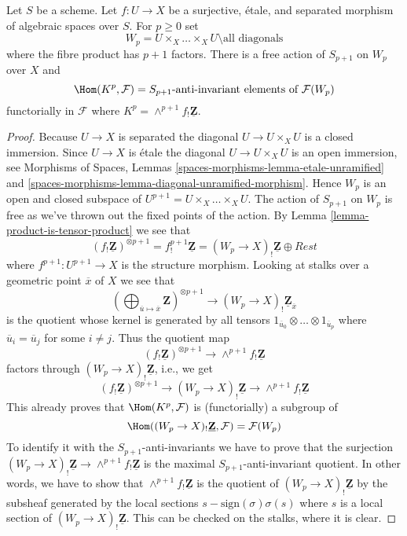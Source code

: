 \begin{lemma}
\label{lemma-compute}
Let $S$ be a scheme. Let $f : U \to X$ be a surjective, \'etale, and separated
morphism of algebraic spaces over $S$. For $p \geq 0$ set
$$
W_p = U \times_X \ldots \times_X U \setminus \text{all diagonals}
$$
where the fibre product has $p + 1$ factors.
There is a free action of $S_{p + 1}$ on $W_p$ over $X$ and
$$
\Hom(K^p, \mathcal{F}) = S_{p + 1}\text{-anti-invariant elements of }
\mathcal{F}(W_p)
$$
functorially in $\mathcal{F}$ where
$K^p = \wedge^{p + 1}f_!\underline{\mathbf{Z}}$.
\end{lemma}

\begin{proof}
Because $U \to X$ is separated the diagonal $U \to U \times_X U$ is a
closed immersion. Since $U \to X$ is \'etale the diagonal
$U \to U \times_X U$ is an open immersion, see
Morphisms of Spaces, Lemmas
\ref{spaces-morphisms-lemma-etale-unramified} and
\ref{spaces-morphisms-lemma-diagonal-unramified-morphism}.
Hence $W_p$ is an open and closed subspace of
$U^{p + 1} = U \times_X \ldots \times_X U$. The action of $S_{p + 1}$
on $W_p$ is free as we've thrown out the fixed points of the action.
By
Lemma \ref{lemma-product-is-tensor-product}
we see that
$$
(f_!\underline{\mathbf{Z}})^{\otimes p + 1} =
f^{p + 1}_!\underline{\mathbf{Z}} = (W_p \to X)_!\underline{\mathbf{Z}}
\oplus Rest
$$
where $f^{p + 1} : U^{p + 1} \to X$ is the structure morphism.
Looking at stalks over a geometric point $\overline{x}$ of $X$
we see that
$$
\left(
\bigoplus\nolimits_{\overline{u} \mapsto \overline{x}} \mathbf{Z}
\right)^{\otimes p + 1}
\longrightarrow
(W_p \to X)_!\underline{\mathbf{Z}}_{\overline{x}}
$$
is the quotient whose kernel is generated by all tensors
$1_{\overline{u}_0} \otimes \ldots \otimes 1_{\overline{u}_p}$
where $\overline{u}_i = \overline{u}_j$ for some $i \not = j$.
Thus the quotient map
$$
(f_!\underline{\mathbf{Z}})^{\otimes p + 1}
\longrightarrow
\wedge^{p + 1}f_!\underline{\mathbf{Z}}
$$
factors through $(W_p \to X)_!\underline{\mathbf{Z}}$, i.e., we get
$$
(f_!\underline{\mathbf{Z}})^{\otimes p + 1}
\longrightarrow
(W_p \to X)_!\underline{\mathbf{Z}}
\longrightarrow
\wedge^{p + 1}f_!\underline{\mathbf{Z}}
$$
This already proves that $\Hom(K^p, \mathcal{F})$ is (functorially) a
subgroup of
$$
\Hom((W_p \to X)_!\underline{\mathbf{Z}}, \mathcal{F}) = \mathcal{F}(W_p)
$$
To identify it with the $S_{p + 1}$-anti-invariants we have to prove that
the surjection $(W_p \to X)_!\underline{\mathbf{Z}}
\to \wedge^{p + 1}f_!\underline{\mathbf{Z}}$ is the maximal
$S_{p + 1}$-anti-invariant quotient. In other words, we have to show that
$\wedge^{p + 1}f_!\underline{\mathbf{Z}}$ is the quotient of
$(W_p \to X)_!\underline{\mathbf{Z}}$ by the subsheaf generated by
the local sections $s - \text{sign}(\sigma)\sigma(s)$ where $s$ is
a local section of $(W_p \to X)_!\underline{\mathbf{Z}}$.
This can be checked on the stalks, where it is clear.
\end{proof}

